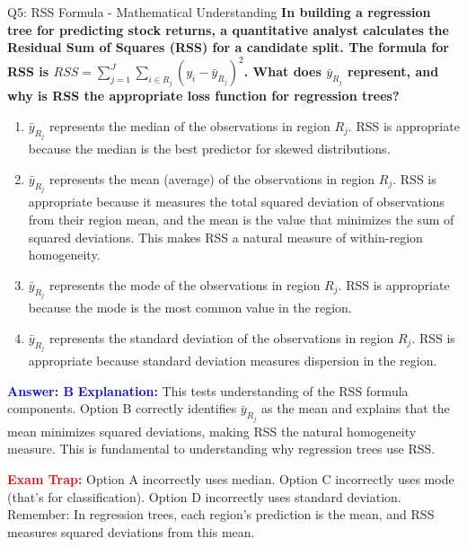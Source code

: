 \documentclass[8pt]{beamer}
\begin{document}
	\begin{frame}{Q5: RSS Formula - Mathematical Understanding}
		\fontsize{6.5}{7.5}\selectfont
		\textbf{In building a regression tree for predicting stock returns, a quantitative analyst calculates the Residual Sum of Squares (RSS) for a candidate split. The formula for RSS is $RSS = \sum_{j=1}^J \sum_{i \in R_j} (y_i - \bar{y}_{R_j})^2$. What does $\bar{y}_{R_j}$ represent, and why is RSS the appropriate loss function for regression trees?}
		
		\begin{enumerate}
			\item $\bar{y}_{R_j}$ represents the median of the observations in region $R_j$. RSS is appropriate because the median is the best predictor for skewed distributions.
			\item $\bar{y}_{R_j}$ represents the mean (average) of the observations in region $R_j$. RSS is appropriate because it measures the total squared deviation of observations from their region mean, and the mean is the value that minimizes the sum of squared deviations. This makes RSS a natural measure of within-region homogeneity.
			\item $\bar{y}_{R_j}$ represents the mode of the observations in region $R_j$. RSS is appropriate because the mode is the most common value in the region.
			\item $\bar{y}_{R_j}$ represents the standard deviation of the observations in region $R_j$. RSS is appropriate because standard deviation measures dispersion in the region.
		\end{enumerate}
		
		\vspace{0.1cm}
		\textcolor{blue}{\textbf{Answer: B}}
		\vspace{0.1cm}
		\textcolor{blue}{\textbf{Explanation:}} This tests understanding of the RSS formula components. Option B correctly identifies $\bar{y}_{R_j}$ as the mean and explains that the mean minimizes squared deviations, making RSS the natural homogeneity measure. This is fundamental to understanding why regression trees use RSS.
		
		\textcolor{red}{\textbf{Exam Trap:}} Option A incorrectly uses median. Option C incorrectly uses mode (that's for classification). Option D incorrectly uses standard deviation. Remember: In regression trees, each region's prediction is the mean, and RSS measures squared deviations from this mean.
	\end{frame}
	
\end{document}
